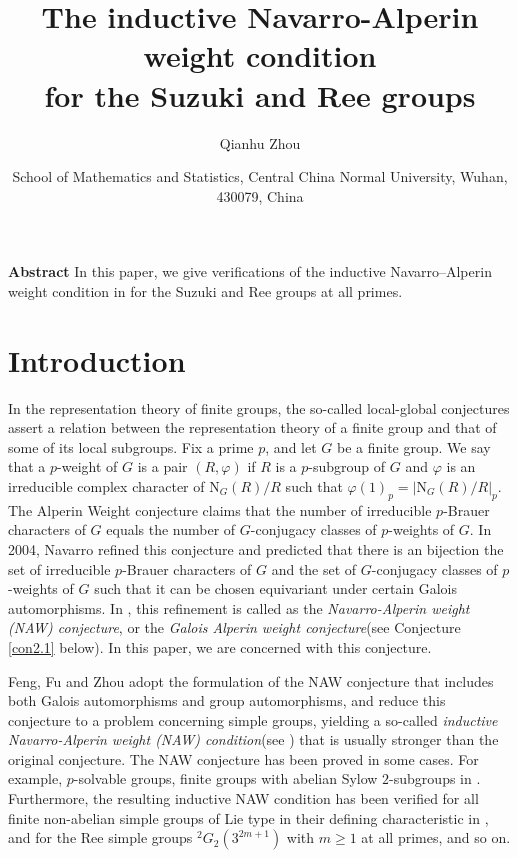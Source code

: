 \documentclass[11pt,a4paper]{article}
\title{\bfseries The inductive Navarro-Alperin weight condition\\ for the Suzuki and Ree groups}
\author{Qianhu Zhou}
\date{\scriptsize School of Mathematics and Statistics, Central China Normal University, Wuhan, 430079, China}
\numberwithin{equation}{section}
\theoremstyle{definition}
\theoremstyle{remark}
\newcommand{\NN}{\mathrm N}
\begin{document}
\maketitle
{\noindent\small{\bf Abstract}
In this paper, we give verifications of  the inductive Navarro–Alperin weight condition in \cite{FFZ} for the Suzuki and Ree groups at all primes.}

\medskip{}


\section{Introduction}\label{sec:intro}
In the representation theory of finite groups, the so-called local-global conjectures assert a relation between the representation theory of a finite group and that of some of its local subgroups. Fix a prime $p$, and let $G$ be a finite group. We say that a $p$-weight of $G$ is a pair $(R,\varphi)$ if $R$ is a $p$-subgroup of $G$ and $\varphi$ is an irreducible complex character of $\NN_G(R)/R$ such that $\varphi(1)_p=|\NN_G(R)/R|_p$. The Alperin Weight conjecture \cite{Alperin1987} claims that the number of irreducible $p$-Brauer characters of $G$ equals the number of $G$-conjugacy classes of $p$-weights of $G$.
In 2004, Navarro \cite{Navarro2004} refined this conjecture 
and predicted that there is an bijection the set of irreducible $p$-Brauer characters of $G$ and the set of $G$-conjugacy classes of $p$-weights of $G$ such that it can be chosen equivariant under certain Galois automorphisms.
In \cite{FFZ}, this refinement is called as the \textit{Navarro-Alperin weight (NAW) conjecture}, or the \textit{Galois Alperin weight conjecture}(see Conjecture \ref{con2.1} below). In this paper, we are concerned with this conjecture.

Feng, Fu and Zhou \cite{FFZ} adopt the formulation of the NAW conjecture that includes both Galois automorphisms and group automorphisms, and reduce this conjecture to a problem concerning simple groups, yielding a so-called \textit{inductive Navarro-Alperin weight (NAW) condition}(see \cite[Definition 7.1]{FFZ}) that is usually stronger than the original conjecture. The NAW conjecture has been proved in some cases. For example, $p$-solvable groups, finite groups with abelian Sylow $2$-subgroups in \cite{FFZ}. Furthermore, the resulting inductive NAW condition has been verified  for all finite non-abelian simple groups of Lie type in their defining characteristic in \cite{FFZ}, and for the Ree simple groups ${}^2G_2(3^{2m+1})$ with $m\geq 1$ at all primes, and so on.
\end{document}
